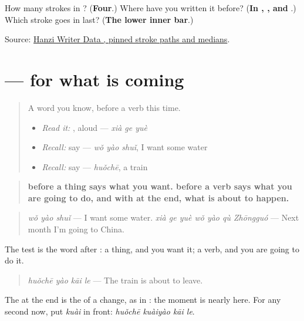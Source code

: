 \begin{tcolorbox}[breakable,colback=teal!4,colframe=teal!35!black,title={Before you move on}]
How many strokes in ? (\textbf{Four}.) Where have you written it before? (\textbf{In , ,  and }.) Which stroke goes in last? (\textbf{The lower inner bar}.)

Source: \href{https://raw.githubusercontent.com/chanind/hanzi-writer-data/68d10a4b21150cae5e1ebbd223eed289cf32d90c/data/\%E6\%9C\%88.json}{Hanzi Writer Data , pinned stroke paths and medians}.
\end{tcolorbox}
\section[\texorpdfstring{\zh{火车要开了} (huǒchē yào kāi le)}{火车要开了 (huǒchē yào kāi le)}]{ —  for what is coming}

\label{lesson:ZH-C148-yao-future}



\begin{quote}
A word you know, before a verb this time.

\begin{itemize}
\raggedright
  \item \emph{Read it:} , aloud — \emph{xià ge yuè}
  \item \emph{Recall:} say  — \emph{wǒ yào shuǐ}, I want some water
  \item \emph{Recall:} say  — \emph{huǒchē}, a train
\end{itemize}
\end{quote}

\begin{grammarlens}[title={Grammar Lens: \zh{要} before a verb, for what is coming}]
\begin{quote}
\textbf{ before a thing says what you want.  before a verb says what you are going to do, and with  at the end, what is about to happen.}
\end{quote}

\begin{quote}
\textbf{} \emph{wǒ yào shuǐ} — I want some water. \textbf{} \emph{xià ge yuè wǒ yào qù Zhōngguó} — Next month I'm going to China.
\end{quote}

The test is the word after : a thing, and you want it; a verb, and you are going to do it.

\begin{quote}
\textbf{} \emph{huǒchē yào kāi le} — The train is about to leave.
\end{quote}

The  at the end is the  of a change, as in : the moment is nearly here. For any second now, put \emph{kuài} in front: \emph{huǒchē kuàiyào kāi le}.
\end{grammarlens}

